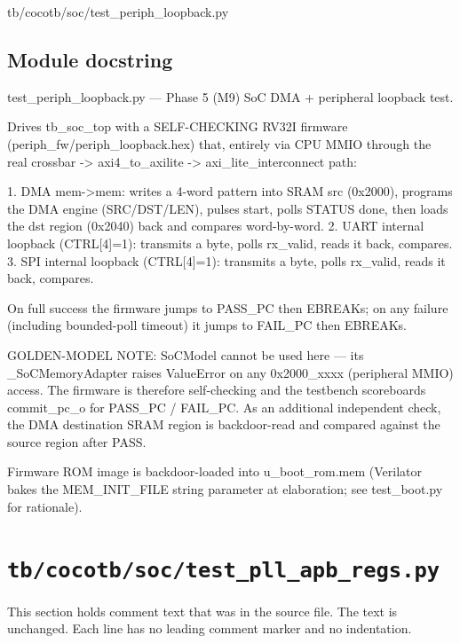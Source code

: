 \begin{relocated}{tb/cocotb/soc/test_periph_loopback.py}

\subsection*{Module docstring}

\begin{textblock}
test_periph_loopback.py — Phase 5 (M9) SoC DMA + peripheral loopback test.

Drives tb_soc_top with a SELF-CHECKING RV32I firmware (periph_fw/periph_loopback.hex)
that, entirely via CPU MMIO through the real crossbar -> axi4_to_axilite ->
axi_lite_interconnect path:

1. DMA mem->mem: writes a 4-word pattern into SRAM src (0x2000), programs the
DMA engine (SRC/DST/LEN), pulses start, polls STATUS done, then loads the
dst region (0x2040) back and compares word-by-word.
2. UART internal loopback (CTRL[4]=1): transmits a byte, polls rx_valid, reads
it back, compares.
3. SPI internal loopback (CTRL[4]=1): transmits a byte, polls rx_valid, reads
it back, compares.

On full success the firmware jumps to PASS_PC then EBREAKs; on any failure
(including bounded-poll timeout) it jumps to FAIL_PC then EBREAKs.

GOLDEN-MODEL NOTE:
SoCModel cannot be used here — its _SoCMemoryAdapter raises ValueError on any
0x2000_xxxx (peripheral MMIO) access. The firmware is therefore self-checking
and the testbench scoreboards commit_pc_o for PASS_PC / FAIL_PC. As an
additional independent check, the DMA destination SRAM region is backdoor-read
and compared against the source region after PASS.

Firmware ROM image is backdoor-loaded into u_boot_rom.mem (Verilator bakes the
MEM_INIT_FILE string parameter at elaboration; see test_boot.py for rationale).
\end{textblock}

\end{relocated}

\section{\texttt{tb/cocotb/soc/test\_pll\_apb\_regs.py}}\label{tm:suite:soc-test-pll-apb-regs}

This section holds comment text that was in the source file. The text is unchanged. Each line has no leading comment marker and no indentation.

